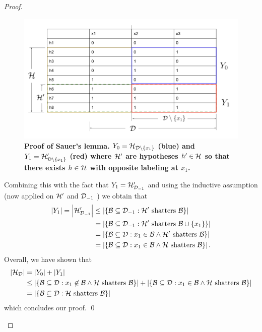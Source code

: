 \documentclass[11pt]{article}
\begin{document}
\begin{itemize}
\begin{proof}
\begin{enumerate}
\begin{figure}
\begin{minipage}[t]{1\linewidth}
  \centering
  \centerline{\includegraphics[scale = 0.4]{proof_sauer_lemma.png}}
\end{minipage}
\caption{\footnotesize{\textbf{Proof of Sauer's lemma. $Y_0 = {\mathcal H}_{{\mathcal D}\setminus \left\{x_1\right\}}$ (blue) and $Y_1 = {\mathcal H}'_{{\mathcal D}\setminus \left\{x_1\right\}}$ (red) where ${\mathcal H}'$ are hypotheses $h'\in {\mathcal H}$ so that there exists $h\in {\mathcal H}$ with opposite labeling at $x_1$.   \citep{shalev2014understanding}}}}
\label{fig: proof_sauer_lemma}
\end{figure}

Combining this with the fact that $Y_1 = {\mathcal H}'_{{\mathcal D}_{-1}}$ and using the inductive assumption (now applied on ${\mathcal H}'$ and ${\mathcal D}_{-1}$ ) we obtain that
\begin{align*}
\left\lvert Y_1 \right\rvert = \left\lvert  {\mathcal H}'_{{\mathcal D}_{-1}} \right\rvert &\le \left\lvert \left\{{\mathcal B} \subseteq {\mathcal D}_{-1}:  {\mathcal H}'\text{ shatters }{\mathcal B} \right\} \right\rvert \\
&= \left\lvert \left\{{\mathcal B} \subseteq {\mathcal D}_{-1}:  {\mathcal H}'\text{ shatters }{\mathcal B}\cup\left\{x_1\right\} \right\} \right\rvert \\
&= \left\lvert \left\{{\mathcal B} \subseteq {\mathcal D}:  x_1 \in {\mathcal B} \land {\mathcal H}'\text{ shatters }{\mathcal B} \right\} \right\rvert \\
&= \left\lvert \left\{{\mathcal B} \subseteq {\mathcal D}:  x_1 \in {\mathcal B} \land {\mathcal H} \text{ shatters }{\mathcal B} \right\} \right\rvert.
\end{align*}
Overall, we have shown that
\begin{align*}
\left\lvert {\mathcal H}_{{\mathcal D}} \right\rvert &= \left\lvert Y_0 \right\rvert + \left\lvert Y_1 \right\rvert \\
&\le \left\lvert \left\{{\mathcal B} \subseteq {\mathcal D}: x_1 \not\in {\mathcal B} \land {\mathcal H}\text{ shatters }{\mathcal B}\right\} \right\rvert +  \left\lvert \left\{{\mathcal B} \subseteq {\mathcal D}:  x_1 \in {\mathcal B} \land {\mathcal H} \text{ shatters }{\mathcal B} \right\} \right\rvert\\
&= \left\lvert \left\{{\mathcal B} \subseteq {\mathcal D}: {\mathcal H}\text{ shatters }{\mathcal B}\right\} \right\rvert
\end{align*}
which concludes our proof. \qed
\end{enumerate}
\end{proof}
\end{itemize}
\end{document}
